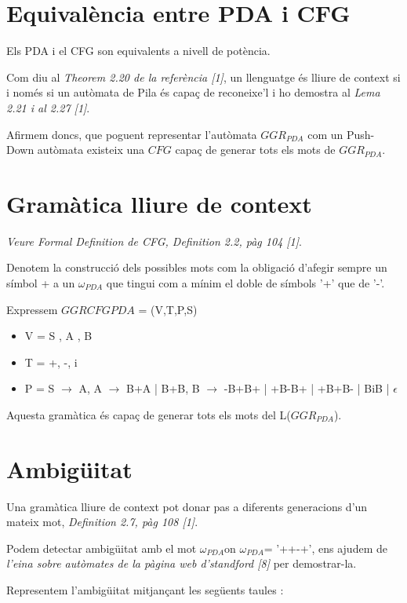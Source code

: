 \documentclass[12pt,a4paper]{report}
\def \wpda{$\omega_{PDA} $}
\def \pdaCFG{$GGRCFG{PDA} $}
\def \pda{$GGR_{PDA} $}
\begin{document}
\section{Equivalència entre PDA i CFG}

Els PDA i el CFG son equivalents a nivell de potència. 

Com diu al \textit{Theorem 2.20 de la referència [1]}, un llenguatge és lliure de context si i només si un autòmata de Pila és capaç de reconeixe’l i ho demostra al \textit{Lema 2.21 i al 2.27 [1]}.

Afirmem doncs, que poguent representar l’autòmata \pda{} com un Push-Down autòmata existeix una $CFG$ capaç de generar tots els mots de \pda{}.

\section{Gramàtica lliure de context}

\textit{Veure Formal Definition de CFG, Definition 2.2, pàg 104 [1]}.

Denotem la construcció dels possibles mots com la obligació d’afegir sempre un símbol + a un \wpda{} que tingui com a mínim el doble de símbols '+' que de '-'.

Expressem \pdaCFG{} = (V,T,P,S)

\begin{itemize}
\item V  = {S , A , B}
\item T = {+, -, i }
\item P = {
		S $\rightarrow$ A,
		A $\rightarrow$ B+A | B+B,
		B $\rightarrow$ -B+B+ | +B-B+ | +B+B- | BiB | $\epsilon$
      }
\end{itemize}

Aquesta gramàtica és capaç de generar tots els mots del L(\pda{}).

\section{Ambigüitat}

Una gramàtica lliure de context pot donar pas a diferents generacions d’un mateix mot, \textit{Definition 2.7, pàg 108 [1]}. 

Podem detectar ambigüitat amb el mot \wpda on \wpda = '++-+', ens ajudem de \textit{l'eina sobre autòmates de la pàgina web d'standford [8]} per demostrar-la. 

Representem l'ambigüitat mitjançant les següents taules : 
\end{document}
